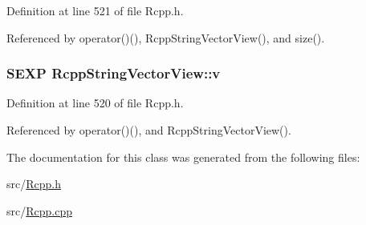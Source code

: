 Definition at line 521 of file Rcpp.h.

Referenced by operator()(), RcppStringVectorView(), and size().\hypertarget{classRcppStringVectorView_1db3cc1a2dd1809151351c123343c15e}{
\subsubsection[{v}]{\setlength{\rightskip}{0pt plus 5cm}SEXP {\bf RcppStringVectorView::v}}}
\label{classRcppStringVectorView_1db3cc1a2dd1809151351c123343c15e}




Definition at line 520 of file Rcpp.h.

Referenced by operator()(), and RcppStringVectorView().

The documentation for this class was generated from the following files:\begin{CompactItemize}
\item 
src/\hyperlink{Rcpp_8h}{Rcpp.h}\item 
src/\hyperlink{Rcpp_8cpp}{Rcpp.cpp}\end{CompactItemize}
